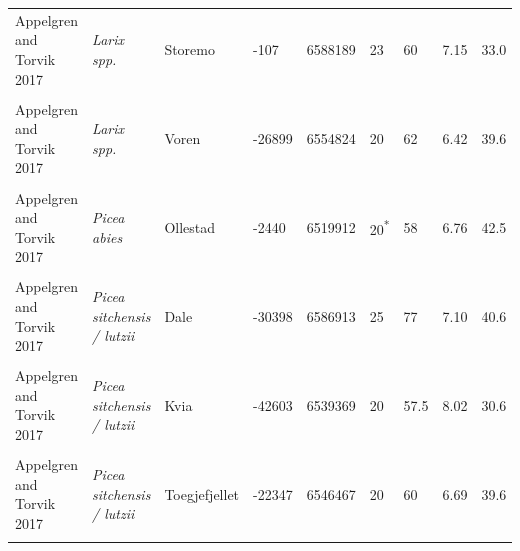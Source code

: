 \documentclass[
]{article}
\begin{document}
\begin{landscape}
\begin{longtable}[t]{l>{}llllllll}
\addlinespace
Appelgren and Torvik 2017 & \em{Larix spp.} & Storemo & -107 & 6588189 & 23 & 60 & 7.15 & 33.0\\
\cellcolor{gray!6}{Appelgren and Torvik 2017} & \em{\cellcolor{gray!6}{Larix spp.}} & \cellcolor{gray!6}{Toegjefjellet} & \cellcolor{gray!6}{-22293} & \cellcolor{gray!6}{6546411} & \cellcolor{gray!6}{20} & \cellcolor{gray!6}{60} & \cellcolor{gray!6}{6.69} & \cellcolor{gray!6}{39.6}\\
Appelgren and Torvik 2017 & \em{Larix spp.} & Voren & -26899 & 6554824 & 20 & 62 & 6.42 & 39.6\\
\cellcolor{gray!6}{Appelgren and Torvik 2017} & \em{\cellcolor{gray!6}{Picea abies}} & \cellcolor{gray!6}{Mysingveien} & \cellcolor{gray!6}{-10547} & \cellcolor{gray!6}{6522150} & \cellcolor{gray!6}{21} & \cellcolor{gray!6}{52} & \cellcolor{gray!6}{6.34} & \cellcolor{gray!6}{53.9}\\
Appelgren and Torvik 2017 & \em{Picea abies} & Ollestad & -2440 & 6519912 & 20\textsuperscript{*} & 58 & 6.76 & 42.5\\
\addlinespace
\cellcolor{gray!6}{Appelgren and Torvik 2017} & \em{\cellcolor{gray!6}{Picea abies}} & \cellcolor{gray!6}{Varland} & \cellcolor{gray!6}{-15600} & \cellcolor{gray!6}{6584801} & \cellcolor{gray!6}{22} & \cellcolor{gray!6}{60} & \cellcolor{gray!6}{6.94} & \cellcolor{gray!6}{36.2}\\
Appelgren and Torvik 2017 & \em{Picea sitchensis / lutzii} & Dale & -30398 & 6586913 & 25 & 77 & 7.10 & 40.6\\
\cellcolor{gray!6}{Appelgren and Torvik 2017} & \em{\cellcolor{gray!6}{Picea sitchensis / lutzii}} & \cellcolor{gray!6}{Fjoesne} & \cellcolor{gray!6}{-11052} & \cellcolor{gray!6}{6650525} & \cellcolor{gray!6}{22} & \cellcolor{gray!6}{50} & \cellcolor{gray!6}{6.11} & \cellcolor{gray!6}{60.1}\\
Appelgren and Torvik 2017 & \em{Picea sitchensis / lutzii} & Kvia & -42603 & 6539369 & 20 & 57.5 & 8.02 & 30.6\\
\cellcolor{gray!6}{Appelgren and Torvik 2017} & \em{\cellcolor{gray!6}{Picea sitchensis / lutzii}} & \cellcolor{gray!6}{Roeynaasen} & \cellcolor{gray!6}{-31321} & \cellcolor{gray!6}{6548005} & \cellcolor{gray!6}{23} & \cellcolor{gray!6}{77.5} & \cellcolor{gray!6}{6.88} & \cellcolor{gray!6}{36.5}\\
\addlinespace
Appelgren and Torvik 2017 & \em{Picea sitchensis / lutzii} & Toegjefjellet & -22347 & 6546467 & 20 & 60 & 6.69 & 39.6\\
\cellcolor{gray!6}{Appelgren and Torvik 2017} & \em{\cellcolor{gray!6}{Picea sitchensis / lutzii}} & \cellcolor{gray!6}{Voren} & \cellcolor{gray!6}{-26991} & \cellcolor{gray!6}{6554850} & \cellcolor{gray!6}{18} & \cellcolor{gray!6}{52.5} & \cellcolor{gray!6}{6.42} & \cellcolor{gray!6}{39.6}\\

\end{longtable}
\end{landscape}
\end{document}
